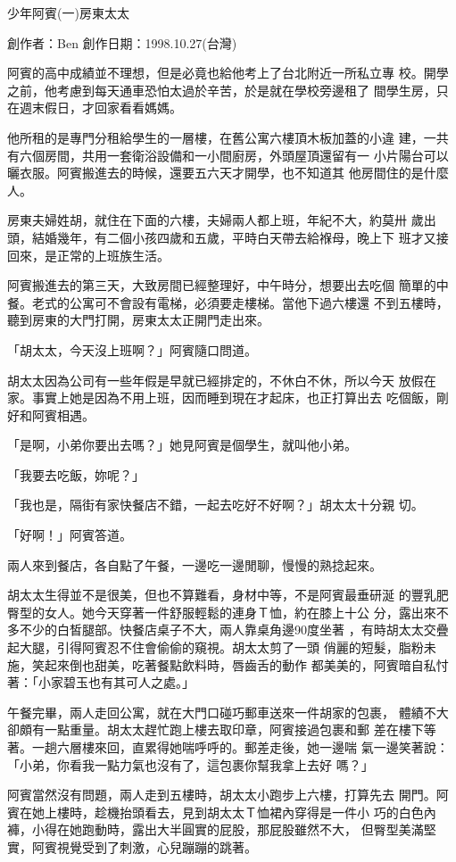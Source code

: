 



少年阿賓(一)房東太太

創作者：Ben
創作日期：1998.10.27(台灣)


阿賓的高中成績並不理想，但是必竟也給他考上了台北附近一所私立專
校。開學之前，他考慮到每天通車恐怕太過於辛苦，於是就在學校旁邊租了
間學生房，只在週末假日，才回家看看媽媽。

他所租的是專門分租給學生的一層樓，在舊公寓六樓頂木板加蓋的小違
建，一共有六個房間，共用一套衛浴設備和一小間廚房，外頭屋頂還留有一
小片陽台可以曬衣服。阿賓搬進去的時候，還要五六天才開學，也不知道其
他房間住的是什麼人。

房東夫婦姓胡，就住在下面的六樓，夫婦兩人都上班，年紀不大，約莫卅
歲出頭，結婚幾年，有二個小孩四歲和五歲，平時白天帶去給褓母，晚上下
班才又接回來，是正常的上班族生活。

阿賓搬進去的第三天，大致房間已經整理好，中午時分，想要出去吃個
簡單的中餐。老式的公寓可不會設有電梯，必須要走樓梯。當他下過六樓還
不到五樓時，聽到房東的大門打開，房東太太正開門走出來。

「胡太太，今天沒上班啊？」阿賓隨口問道。

胡太太因為公司有一些年假是早就已經排定的，不休白不休，所以今天
放假在家。事實上她是因為不用上班，因而睡到現在才起床，也正打算出去
吃個飯，剛好和阿賓相遇。

「是啊，小弟你要出去嗎？」她見阿賓是個學生，就叫他小弟。

「我要去吃飯，妳呢？」

「我也是，隔街有家快餐店不錯，一起去吃好不好啊？」胡太太十分親
切。

「好啊！」阿賓答道。

兩人來到餐店，各自點了午餐，一邊吃一邊閒聊，慢慢的熟捻起來。

胡太太生得並不是很美，但也不算難看，身材中等，不是阿賓最垂研涎
的豐乳肥臀型的女人。她今天穿著一件舒服輕鬆的連身Ｔ恤，約在膝上十公
分，露出來不多不少的白皙腿部。快餐店桌子不大，兩人靠桌角邊90度坐著
，有時胡太太交疊起大腿，引得阿賓忍不住會偷偷的窺視。胡太太剪了一頭
俏麗的短髮，脂粉未施，笑起來倒也甜美，吃著餐點飲料時，唇齒舌的動作
都美美的，阿賓暗自私忖著：「小家碧玉也有其可人之處。」

午餐完畢，兩人走回公寓，就在大門口碰巧郵車送來一件胡家的包裹，
體績不大卻頗有一點重量。胡太太趕忙跑上樓去取印章，阿賓接過包裹和郵
差在樓下等著。一趟六層樓來回，直累得她喘呼呼的。郵差走後，她一邊喘
氣一邊笑著說：「小弟，你看我一點力氣也沒有了，這包裹你幫我拿上去好
嗎？」

阿賓當然沒有問題，兩人走到五樓時，胡太太小跑步上六樓，打算先去
開門。阿賓在她上樓時，趁機抬頭看去，見到胡太太Ｔ恤裙內穿得是一件小
巧的白色內褲，小得在她跑動時，露出大半圓實的屁股，那屁股雖然不大，
但臀型美滿堅實，阿賓視覺受到了刺激，心兒蹦蹦的跳著。

